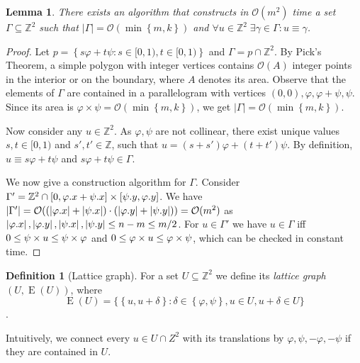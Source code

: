 \documentclass[11pt, letterpaper]{article}
\theoremstyle{plain}
\newtheorem{lemma}{Lemma}
\theoremstyle{definition}
\newtheorem{definition}{Definition}
\theoremstyle{remark}
\newcommand{\Z}{\mathbb{Z}}
\renewcommand{\O}{\mathcal{O}}
\renewcommand{\phi}{\varphi}
\newcommand{\set}[1]{\left\lbrace #1 \right\rbrace}
\newcommand{\bigset}[1]{\big \lbrace #1 \big \rbrace}
\DeclareMathOperator*{\Edges}{E}
\newcommand{\absolute}[1]{\left\lvert#1\right\rvert}
\begin{document}
\begin{lemma} \label{lattice_base}
	There exists an algorithm that constructs in $\O(m^2)$ time a set $\Gamma \subseteq \Z^2$ such that $\absolute{\Gamma} = \O(\min\set{m, k})$ and $\forall u \in \Z^2 \; \exists \gamma \in \Gamma : u \equiv \gamma$.
\end{lemma} 
	\begin{proof}
		Let $p = \set{s\phi + t\psi : s \in [0, 1), t \in [0, 1)}$ and $\Gamma = p \cap \Z^2$.
		By Pick's Theorem, a simple polygon with integer vertices contains $\O(A)$ integer points in the interior or on the boundary, where $A$ denotes its area.
		Observe that the elements of $\Gamma$ are contained in a parallelogram with vertices $(0, 0), \phi, \phi + \psi, \psi$.
		Since its area is $\phi \times \psi = \O(\min\set{m, k})$, we get $\absolute{\Gamma} = \O(\min\set{m, k})$.
		
		Now consider any $u \in \Z^2$.
		As $\phi, \psi$ are not collinear, there exist unique values $s, t \in [0, 1)$ and $s', t' \in \Z$, such that
		$u = (s + s') \phi + (t + t') \psi$.
		By definition, 
		$u \equiv s\phi + t\psi$ and $s\phi + t\psi \in \Gamma$.
		
		We now give a construction algorithm for $\Gamma$. Consider $\Gamma' = \Z^2 \cap [0,\x{\phi}+\x{\psi}] \times [\y{\psi},\y{\phi}]$. We have $\absolute{\Gamma'} = \O((\absolute{\x{\phi}}+\absolute{\x{\psi}}) \cdot (\absolute{\y{\phi}}+\absolute{\y{\psi}})) = \O(m^2)$ as $\absolute{\x{\phi}}, \absolute{\y{\phi}}, \absolute{\x{\psi}}, \absolute{\y{\psi}} \le n - m \le m / 2$. For $u \in \Gamma'$ we have $u \in \Gamma$ iff $0 \le \s{u} \le \s{\phi}$ and $0 \le \h{u} \le \h{\psi}$, which can be checked in constant time. 
	\end{proof}

\begin{definition}[Lattice graph]
	For a set $U \subseteq \Z^2$ we define its \emph{lattice graph} $(U, \Edges(U))$, where
	\[ \Edges(U) = \bigset{\set{u, u + \delta} : \delta \in \set{\phi, \psi}, u \in U, u + \delta \in U}\].
\end{definition}
Intuitively, we connect every $u \in U \cap Z^2$ with its translations by $\phi, \psi, -\phi, -\psi$ if they are contained in $U$.
\end{document}
